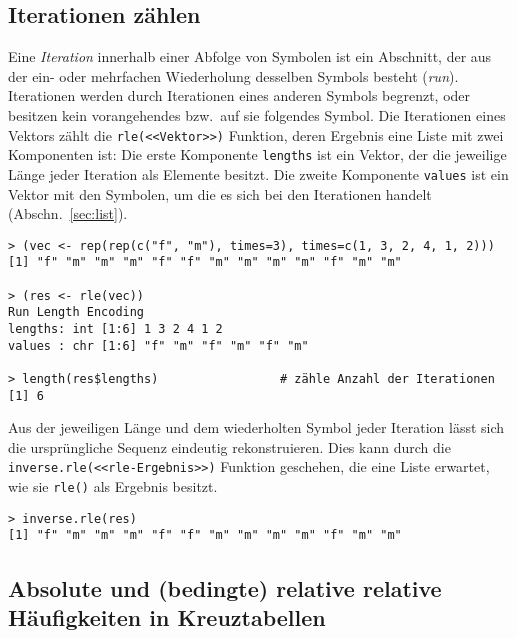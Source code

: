 \subsection{Iterationen zählen}
\label{sec:runs}

Eine \emph{Iteration} innerhalb einer Abfolge von Symbolen ist ein Abschnitt, der aus der ein- oder mehrfachen Wiederholung desselben Symbols besteht (\emph{run}). Iterationen werden durch Iterationen eines anderen Symbols begrenzt, oder besitzen kein vorangehendes bzw.\ auf sie folgendes Symbol. Die Iterationen eines Vektors zählt die \lstinline!rle(<<Vektor>>)! Funktion, deren Ergebnis eine Liste mit zwei Komponenten ist: Die erste Komponente \lstinline!lengths! ist ein Vektor, der die jeweilige Länge jeder Iteration als Elemente besitzt. Die zweite Komponente \lstinline!values! ist ein Vektor mit den Symbolen, um die es sich bei den Iterationen handelt (Abschn.\ \ref{sec:list}).
\begin{lstlisting}
> (vec <- rep(rep(c("f", "m"), times=3), times=c(1, 3, 2, 4, 1, 2)))
[1] "f" "m" "m" "m" "f" "f" "m" "m" "m" "m" "f" "m" "m"

> (res <- rle(vec))
Run Length Encoding
lengths: int [1:6] 1 3 2 4 1 2
values : chr [1:6] "f" "m" "f" "m" "f" "m"

> length(res$lengths)                 # zähle Anzahl der Iterationen
[1] 6
\end{lstlisting}

Aus der jeweiligen Länge und dem wiederholten Symbol jeder Iteration lässt sich die ursprüngliche Sequenz eindeutig rekonstruieren. Dies kann durch die \lstinline!inverse.rle(<<rle-Ergebnis>>)! Funktion geschehen, die eine Liste erwartet, wie sie \lstinline!rle()! als Ergebnis besitzt.
\begin{lstlisting}
> inverse.rle(res)
[1] "f" "m" "m" "m" "f" "f" "m" "m" "m" "m" "f" "m" "m"
\end{lstlisting}

\subsection{Absolute und (bedingte) relative relative Häufigkeiten in Kreuztabellen}
\label{sec:xtabs}

